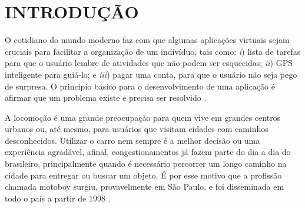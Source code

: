 
\chapter{INTRODUÇÃO}


O cotidiano do mundo moderno faz com que algumas aplicações virtuais sejam cruciais para facilitar a organização de um indivíduo, tais como: \textit{i}) lista de tarefas para que o usuário lembre de atividades que não podem ser esquecidas; \textit{ii}) GPS inteligente para guiá-lo; e \textit{iii}) pagar uma conta, para que o usuário não seja pego de surpresa. O princípio básico para o desenvolvimento de uma aplicação é afirmar que um problema existe e precisa ser resolvido \cite{desenvWebFrame}.


A locomoção é uma grande preocupação para quem vive em grandes centros urbanos ou, até mesmo, para usuários que visitam cidades com caminhos desconhecidos. Utilizar o carro nem sempre é a melhor decisão ou uma experiência agradável, afinal, congestionamentos já fazem parte do dia a dia do brasileiro, principalmente quando é necessário percorrer um longo caminho na cidade para entregar ou buscar um objeto. É por esse motivo que a profissão chamada motoboy surgiu, provavelmente em São Paulo, e foi disseminada em todo o país a partir de 1998 \cite{MotoboyVeja}.

